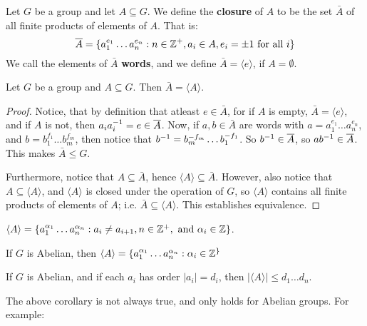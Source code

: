 \begin{definition}
  Let $G$ be a group and let  $A \subseteq G$. We define the  \textbf{closure}
  of $A$ to be the set $\bar{A}$ of all finite products of elements of $A$.
  That is:
  \begin{equation}
    \overline{A}=\{a_1^{e_1} \dots a_n^{e_n} : n \in \mathbb{Z}^+, a_i \in A, e_i=\pm1
    \text{ for all } i\}
  \end{equation}
  We call the elements of $\bar{A}$ \textbf{words}, and we define
  $\bar{A}=\langle e \rangle$, if $A=\emptyset$.
\end{definition}

\begin{proposition}\label{proposition_2.4.3}
  Let $G$ be a group and  $A \subseteq G$. Then  $\bar{A}=\langle A \rangle$.
\end{proposition}
\begin{proof}
  Notice, that by definition that atleast $e \in \bar{A}$, for if $A$ is empty,
  $\bar{A}=\langle e \rangle$, and if $A$ is not, then  $a_ia_i^{-1}=e \in
  \overline{A}$. Now, if $a,b \in \bar{A}$ are words with $a=a_1^{e_1} \dots
  a_n^{e_n}$, and $b=b_1^{f_1} \dots b_m^{f_m}$, then notice that
  $b^{-1}=b_m^{-f_m} \dots b_1^{-f_1}$. So $b^{-1} \in \overline{A}$, so
  $ab^{-1} \in \overline{A}$. This makes $\bar{A} \leq G$.

  Furthermore, notice that $A \subseteq \bar{A}$, hence $\langle A \rangle
  \subseteq \bar{A}$. However, also notice that $A \subseteq \langle A
  \rangle$, and $\langle A \rangle$ is closed under the operation of $G$, so
  $\langle A \rangle$ contains all finite products of elements of $A$; i.e.
  $\bar{A} \subseteq \langle A \rangle$.
  This establishes equivalence.
\end{proof}
\begin{corollary}
  $\langle A \rangle=\{a_1^{\alpha_1} \dots a_n^{\alpha_n} : a_i \neq a_{i+1},
    n \in \mathbb{Z}^+, \text{ and } \alpha_i \in \mathbb{Z}\}$.
\end{corollary}
\begin{corollary}
  If $G$ is Abelian, then  $\langle A \rangle=\{a_1^{\alpha_1} \dots a_n^{\alpha_n} :
  \alpha_i \in \mathbb{Z}^\}$
\end{corollary}
\begin{corollary}
  If $G$ is Abelian, and if each $a_i$ has order $|a_i|=d_i$, then
  $|\langle A \rangle| \leq d_1 \dots d_n$.
\end{corollary}

The above corollary is not always true, and only holds for Abelian groups. For
example:

